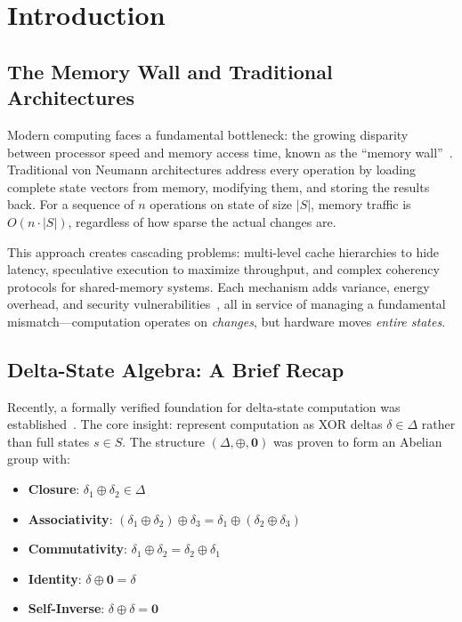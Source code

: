 \documentclass[11pt,letterpaper]{article}
\theoremstyle{plain}
\theoremstyle{definition}
\theoremstyle{remark}
\newcommand{\dcompose}{\oplus}
\newcommand{\dzero}{\mathbf{0}}
\begin{document}
\section{Introduction}
\label{sec:introduction}

\subsection{The Memory Wall and Traditional Architectures}

Modern computing faces a fundamental bottleneck: the growing disparity between processor speed and memory access time, known as the ``memory wall''~\cite{wulf1995hitting}. Traditional von Neumann architectures address every operation by loading complete state vectors from memory, modifying them, and storing the results back. For a sequence of $n$ operations on state of size $|S|$, memory traffic is $O(n \cdot |S|)$, regardless of how sparse the actual changes are.

This approach creates cascading problems: multi-level cache hierarchies to hide latency, speculative execution to maximize throughput, and complex coherency protocols for shared-memory systems. Each mechanism adds variance, energy overhead, and security vulnerabilities~\cite{kocher2019spectre,lipp2018meltdown}, all in service of managing a fundamental mismatch---computation operates on \emph{changes}, but hardware moves \emph{entire states}.

\subsection{Delta-State Algebra: A Brief Recap}

Recently, a formally verified foundation for delta-state computation was established~\cite{paper1}. The core insight: represent computation as XOR deltas $\delta \in \Delta$ rather than full states $s \in S$. The structure $(\Delta, \dcompose, \dzero)$ was proven to form an Abelian group with:

\begin{itemize}
    \item \textbf{Closure}: $\delta_1 \dcompose \delta_2 \in \Delta$
    \item \textbf{Associativity}: $(\delta_1 \dcompose \delta_2) \dcompose \delta_3 = \delta_1 \dcompose (\delta_2 \dcompose \delta_3)$
    \item \textbf{Commutativity}: $\delta_1 \dcompose \delta_2 = \delta_2 \dcompose \delta_1$
    \item \textbf{Identity}: $\delta \dcompose \dzero = \delta$
    \item \textbf{Self-Inverse}: $\delta \dcompose \delta = \dzero$
\end{itemize}
\end{document}
